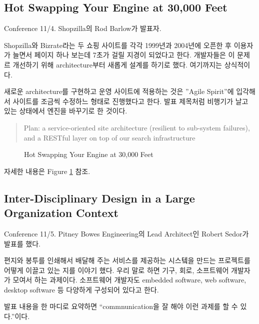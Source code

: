 \documentclass[11pt]{article}
\begin{document}
\subsection{Hot Swapping Your Engine at 30,000 Feet}

Conference 11/4. Shopzilla의 Rod Barlow가 발표자.
 
Shopzilla와 Bizrate라는 두 쇼핑 사이트를 각각 1999년과 2004년에 오픈한
후 이용자가 늘면서 페이지 하나 보는데 7초가 걸릴 지경이 되었다고 한다.
개발자들은 이 문제르 개선하기 위해 architecture부터 새롭게 설계를 하기로 했다.
여기까지는 상식적이다.

새로운 architecture를 구현하고 운영 사이트에 적용하는 것은 ''Agile Spirit''에
입각해서 사이트를 조금씩 수정하느 형태로 진행했다고 한다. 발표 제목처럼
비행기가 날고 있는 상태에서 엔진을 바꾸기로 한 것이다.
 
\begin{quote}
Plan: a service-oriented site architecture (resilient to
sub-system failures), and a RESTful layer on top of our search
infrastructure\cite{barlow}
\end{quote}

\begin{figure}[t]
    \begin{Frame}
        \begin{center}
        \end{center}
    \end{Frame}
    \caption{Hot Swapping Your Engine at 30,000 Feet}
    \label{swapping engine}
\end{figure}

자세한 내용은 Figure \ref{swapping engine} 참조.

\subsection{Inter-Disciplinary Design in a Large
  Organization Context}

Conference 11/5. Pitney Bowes Engineering의 Lead Architect인 
Robert Sedor가 발표를 했다.

편지와 봉투를 인쇄해서 배달해 주는 서비스를 제공하는 시스텤을 만드는
프로젝트를 어떻게 이끌고 있는 지를 이야기 했다.
우리 말로 하면 기구, 회로, 소프트웨어 개발자가 모여서 하는
과제이다. 소프트웨어 개발자도 embedded software, web software, desktop
software 등 다양하게 구성되어 있다고 한다.
 
발표 내용을 한 마디로 요약하면 ``commnunication을 잘 해야 이런 과제를 할 수 
있다.''이다.
 
\end{document}
